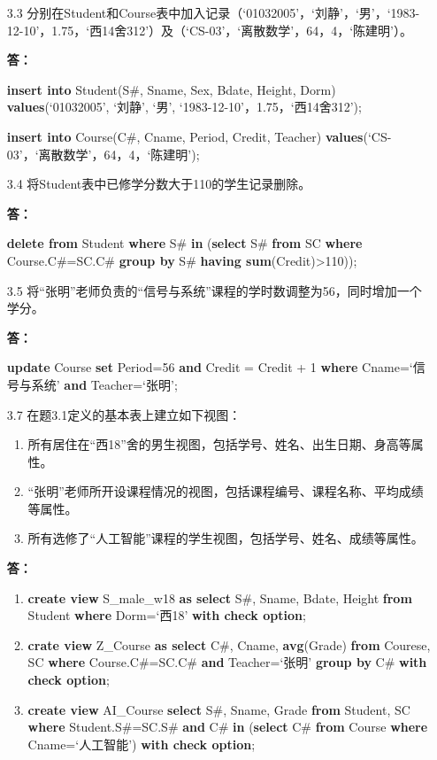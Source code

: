 \begin{enumerate}
    \item[3.3] 分别在Student和Course表中加入记录（‘01032005’，‘刘静’，‘男’，‘1983-12-10’，1.75，‘西14舍312’）及（‘CS-03’，‘离散数学’，64，4，‘陈建明’）。
    
    \textbf{答：}
    
    \textbf{insert into} Student(S\#, Sname, Sex, Bdate, Height, Dorm) \textbf{values}(‘01032005’, ‘刘静’, ‘男’, ‘1983-12-10’，1.75，‘西14舍312’);
    
    \textbf{insert into} Course(C\#, Cname, Period, Credit, Teacher) \textbf{values}(‘CS-03’，‘离散数学’，64，4，‘陈建明’);
    
    \item[3.4]
    将Student表中已修学分数大于110的学生记录删除。
    
    \textbf{答：}
    
    \textbf{delete from} Student \textbf{where} S\# \textbf{in} (\textbf{select} S\# \textbf{from} SC \textbf{where} Course.C\#=SC.C\# \textbf{group by} S\# \textbf{having sum}(Credit)>110));
    
    \item[3.5]
    将“张明”老师负责的“信号与系统”课程的学时数调整为56，同时增加一个学分。
    
    \textbf{答：}
    
    \textbf{update} Course \textbf{set} Period=56 \textbf{and} Credit = Credit + 1 \textbf{where} Cname=‘信号与系统’ \textbf{and} Teacher=‘张明’;
    
    \item[3.7]
    在题3.1定义的基本表上建立如下视图：
    \begin{enumerate}
        \item 所有居住在“西18”舍的男生视图，包括学号、姓名、出生日期、身高等属性。
        \item “张明”老师所开设课程情况的视图，包括课程编号、课程名称、平均成绩等属性。
        \item 所有选修了“人工智能”课程的学生视图，包括学号、姓名、成绩等属性。
    \end{enumerate}
    
    \textbf{答：}
    
    \begin{enumerate}[(1)]
        \item \textbf{create view} S\_male\_w18 \textbf{as select} S\#, Sname, Bdate, Height \textbf{from} Student \textbf{where} Dorm=‘西18’ \textbf{with check option};
        
        \item \textbf{crate view} Z\_Course \textbf{as select} C\#, Cname, \textbf{avg}(Grade) \textbf{from} Courese, SC \textbf{where} Course.C\#=SC.C\# \textbf{and} Teacher=‘张明’ \textbf{group by} C\# \textbf{with check option};
        
        \item \textbf{create view} AI\_Course \textbf{select} S\#, Sname, Grade \textbf{from} Student, SC \textbf{where} Student.S\#=SC.S\# \textbf{and} C\# \textbf{in} (\textbf{select} C\# \textbf{from} Course \textbf{where} Cname=‘人工智能’) \textbf{with check option};
    \end{enumerate}
\end{enumerate}